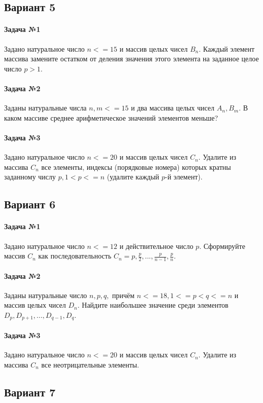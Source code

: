 \documentclass[12pt,a4paper]{report}
\begin{document}
\clearpage
\subsection*{Вариант 5}
\paragraph*{Задача №1}
Задано натуральное число $n <= 15$ и массив целых чисел $B_n$. Каждый элемент массива замените остатком от деления значения этого элемента на заданное целое число $p > 1$.
\paragraph*{Задача №2}
Заданы натуральные числа $n, m <= 15$ и два массива целых чисел $A_n, B_m$. В каком массиве среднее арифметическое значений элементов меньше?
\paragraph*{Задача №3}
Задано натуральное число $n <= 20$ и массив целых чисел $C_n$. Удалите из массива $C_n$ все элементы, индексы (порядковые номера) которых кратны заданному числу $p, 1 < p <= n$ (удалите каждый $p\text{-й}$ элемент).


\subsection*{Вариант 6}
\paragraph*{Задача №1}
Задано натуральное число $n <= 12$ и действительное число $p$. Сформируйте массив $C_n$ как последовательность $C_n = p, \frac{p}{2}, ..., \frac{p}{n-1}, \frac{p}{n}$.
\paragraph*{Задача №2}
Заданы натуральные число $n, p, q, \text{ причём } n <= 18, 1 <= p < q <= n$ и массив целых чисел $D_n$. Найдите наибольшее значение среди элементов $D_p, D_{p+1}, ..., D_{q-1}, D_q$.
\paragraph*{Задача №3}
Задано натуральное число $n <= 20$ и массив целых чисел $C_n$. Удалите из массива $C_n$ все неотрицательные элементы.


\subsection*{Вариант 7}
\end{document}
